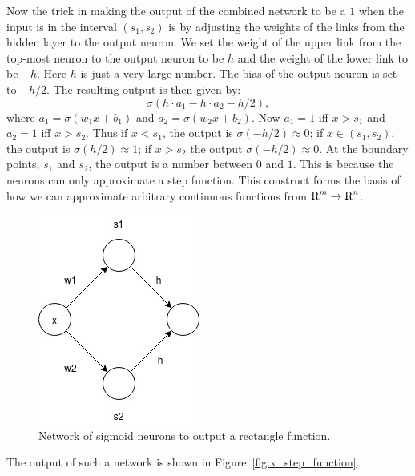 Now the trick in making the output of the combined network to be a $1$ when the
input is in the interval $(s_1, s_2)$ is by adjusting the weights of the links
from the hidden layer to the output neuron. We set the weight of the upper link
from the top-most neuron to the output neuron to be $h$ and the weight of the
lower link to be $-h$. Here $h$ is just a very large number. The bias of the
output neuron is set to $-h/2$. The resulting output is then given by:
\[
    \sigma (h \cdot a_1 - h \cdot a_2 - h/2),
\]
where $a_1 = \sigma(w_1 x + b_1)$ and $a_2 = \sigma(w_2 x + b_2)$.
Now $a_1 = 1$ iff $x > s_1$ and $a_2 = 1$ iff $x > s_2$. Thus if $x < s_1$, 
the output is $\sigma(-h/2) \approx 0$; if $x \in (s_1, s_2)$, 
the output is $\sigma(h/2) \approx 1$; 
if $x > s_2$ the output $\sigma(-h/2) \approx 0$. 
At the boundary points, $s_1$ and $s_2$, 
the output is a number between $0$ and $1$. This is because the neurons 
can only approximate a step function. This construct forms the basis 
of how we can approximate arbitrary continuous functions from $\text{R}^m \to \text{R}^n$. 
\begin{figure}[ht]
\begin{center}
\includegraphics[scale=0.5]{RectFunction.jpg}
\end{center}
\caption{Network of sigmoid neurons to output a rectangle function.}
\label{fig:nn_rect_func}
\end{figure}
The output of such a network is shown in Figure~\ref{fig:x_step_function}. 
